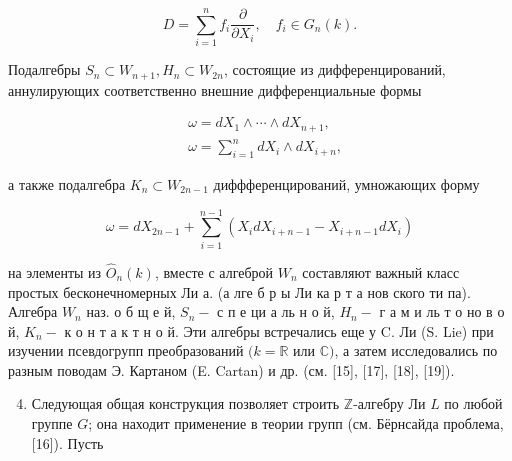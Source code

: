 \documentclass[10pt]{article}
\begin{document}
\[

D=\sum_{i=1}^{n} f_{i} \frac{\partial}{\partial X_{i}}, \quad f_{i} \in G_{n}(k) .

\]



Подалгебры $S_{n} \subset W_{n+1}, H_{n} \subset W_{2 n}$, состоящие из дифференцирований, аннулирующих соответственно внешние дифференциальные формы



\[

\begin{aligned}

& \omega=d X_{1} \wedge \cdots \wedge d X_{n+1}, \\

& \omega=\sum_{i=1}^{n} d X_{i} \wedge d X_{i+n},

\end{aligned}

\]



а также подалгебра $K_{n} \subset W_{2 n-1}$ диффференцирований, умножающих форму



\[

\omega=d X_{2 n-1}+\sum_{i=1}^{n-1}\left(X_{i} d X_{i+n-1}-X_{i+n-1} d X_{i}\right)

\]



на элементы из $\hat{O}_{n}(k)$, вместе с алгеброй $W_{n}$ составляют важный класс простых бесконечномерных Ли а. (а лге б р ы Ли ка р т а нов ского ти па). Алгебра $W_{n}$ наз. о б щ е й, $S_{n}-$ с п е ци а ль н о й, $H_{n}-$ г а м и ль т о но в о й, $K_{n}-$ к о н т а к т н о й. Эти алгебры встречались еще у C. Ли (S. Lie) при изучении псевдогрупп преобразований $(k=\mathbb{R}$ или $\mathbb{C})$, а затем исследовались по разным поводам Э. Картаном (E. Cartan) и др. (см. [15], [17], [18], [19]).



\begin{enumerate}

  \setcounter{enumi}{3}

  \item Следующая общая конструкция позволяет строить $\mathbb{Z}$-алгебру Ли $L$ по любой группе $G$; она находит применение в теории групп (см. Бёрнсайда проблема, [16]). Пусть

\end{enumerate}
\end{document}
